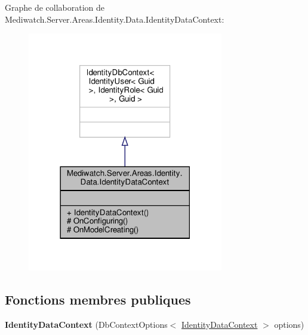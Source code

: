 Graphe de collaboration de Mediwatch.\+Server.\+Areas.\+Identity.\+Data.\+Identity\+Data\+Context\+:\nopagebreak
\begin{figure}[H]
\begin{center}
\leavevmode
\includegraphics[width=242pt]{class_mediwatch_1_1_server_1_1_areas_1_1_identity_1_1_data_1_1_identity_data_context__coll__graph}
\end{center}
\end{figure}
\subsection*{Fonctions membres publiques}
\begin{DoxyCompactItemize}
\item 
\mbox{\label{class_mediwatch_1_1_server_1_1_areas_1_1_identity_1_1_data_1_1_identity_data_context_ace53da6e49b7d2dff2bb67aad43cfa65}} 
{\bfseries Identity\+Data\+Context} (Db\+Context\+Options$<$ \hyperlink{class_mediwatch_1_1_server_1_1_areas_1_1_identity_1_1_data_1_1_identity_data_context}{Identity\+Data\+Context} $>$ options)
\end{DoxyCompactItemize}
